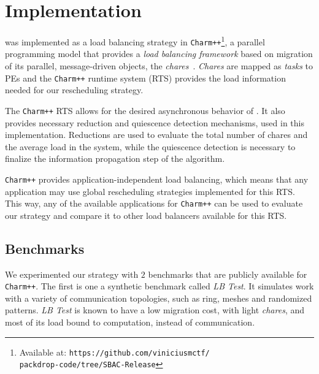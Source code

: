 \section{Implementation} \label{sec:impl}

\packdrop was implemented as a load balancing strategy in \texttt{Charm++}\footnote{Available at: \texttt{https://github.com/viniciusmctf/\\packdrop-code/tree/SBAC-Release}}, a parallel programming model that provides a \textit{load balancing framework} based on migration of its parallel, message-driven objects, the \textit{chares}~\cite{CharmLOTR,sc14charm}.
\textit{Chares} are mapped as \textit{tasks} to PEs and the \texttt{Charm++} runtime system (RTS) provides the load information needed for our rescheduling strategy.

The \texttt{Charm++} RTS allows for the desired asynchronous behavior of \packdrop.
It also provides necessary reduction and quiescence detection mechanisms, used in this implementation.
Reductions are used to evaluate the total number of chares and the average load in the system, while the quiescence detection is necessary to finalize the information propagation step of the algorithm.

\texttt{Charm++} provides application-independent load balancing, which means that any application may use global rescheduling strategies implemented for this RTS.
This way, any of the available applications for \texttt{Charm++} can be used to evaluate our strategy and compare it to other load balancers available for this RTS.


\subsection{Benchmarks} \label{sec:benchmarks}

We experimented our strategy with $2$ benchmarks that are publicly available for \texttt{Charm++}.
The first is one a synthetic benchmark called \textit{LB Test}. 
It simulates work with a variety of communication topologies, such as ring, meshes and randomized patterns.
\textit{LB Test} is known to have a low migration cost, with light \textit{chares}, and most of its load bound to computation, instead of communication.

